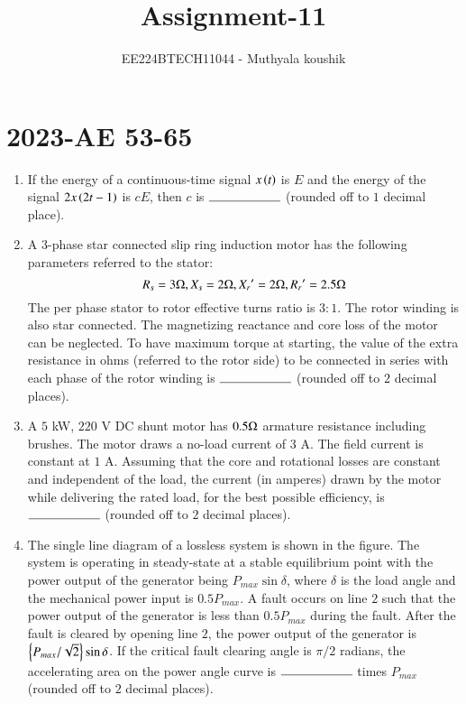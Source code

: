 \documentclass[journal,12pt,onecolumn]{IEEEtran}
\theoremstyle{remark}
\begin{document}

\vspace{3cm}

\title{Assignment-11}
\author{EE224BTECH11044 - Muthyala koushik
}
\maketitle
\bigskip

\renewcommand{\thefigure}{\theenumi}
\renewcommand{\thetable}{\theenumi}

\section{2023-AE 53-65}
\begin{enumerate}[start=53]
	\item If the energy of a continuous-time signal $x\left(t\right)$ is $E$ and the energy of the signal $2x\left(2t-1\right)$ is $cE$, then $c$ is $\rule{2cm}{0.4pt}$ (rounded off to $1$ decimal place).

	\item A $3$-phase star connected slip ring induction motor has the following parameters referred to the stator:
		$$R_s=3\ohm, X_s=2\ohm, {X_r}'=2\ohm, {R_r}'=2.5\ohm$$
The per phase stator to rotor effective turns ratio is $3:1$. The rotor winding is also star connected. The magnetizing reactance and core loss of the motor can be neglected. To have maximum torque at starting, the value of the extra resistance in ohms (referred to the rotor side) to be connected in series with each phase of the rotor winding is $\rule{2cm}{0.4pt}$ (rounded off to $2$ decimal places).

        \item  A $5$ kW, $220$ V DC shunt motor has $0.5\ohm$ armature resistance including brushes. The motor draws a no-load current of $3$ A. The field current is constant at $1$ A. Assuming that the core and rotational losses are constant and independent of the load, the current (in amperes) drawn by the motor while delivering the rated load, for the best possible efficiency, is $\rule{2cm}{0.4pt}$ (rounded off to $2$ decimal places).

	\item The single line diagram of a lossless system is shown in the figure. The system is operating in steady-state at a stable equilibrium point with the power output of the generator being $P_{max}\sin{\delta}$, where $\delta$ is the load angle and the mechanical power input is $0.5P_{max}$. A fault occurs on line $2$ such that the power output of the generator is less than $0.5P_{max}$ during the fault. After the fault is cleared by opening line $2$, the power output of the generator is $\left\{P_{max}/\sqrt{2}\right\}\sin{\delta}$. If the critical fault clearing angle is $\pi/2$ radians, the accelerating area on the power angle curve is $\rule{2cm}{0.4pt}$ times $P_{max}$ (rounded off to $2$ decimal places).
\begin{figure}[H]
    \centering
\end{figure}
		


\end{enumerate}
\end{document}
